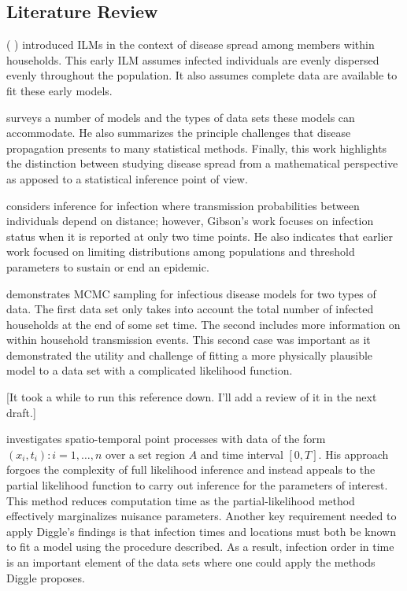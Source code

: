 \documentclass{uwstat572}
\newcommand{\vmcomment}[1]{({\color{blue}{VM's comment:}} \textbf{\color{blue}{#1}})}
\begin{document}
\subsection{Literature Review}
\vmcomment{Again, I don't like this one paper per paragraph. You need better organization of your lit review}
\cite{Haber} introduced ILMs in the context of disease spread among members within households. This early ILM assumes infected individuals are evenly dispersed evenly throughout the population. It also assumes complete data are available to fit these early models. 

\cite{Becker} surveys a number of models and the types of data sets these models can accommodate. 
He also summarizes the principle challenges that disease propagation presents to many statistical methods.
Finally, this work highlights the distinction between studying disease spread from a mathematical perspective as apposed to a statistical inference point of view.  

\cite{Gibson} considers inference for infection where transmission probabilities between individuals depend on distance; however, Gibson's work focuses on infection status when it is reported at only two time points. 
He also indicates that earlier work focused on limiting distributions among populations and threshold parameters to sustain or end an epidemic. 

\cite{ONeill} demonstrates MCMC sampling for infectious disease models for two types of data. 
The first data set only takes into account the total number of infected households at the end of some set time.
The second includes more information on within household transmission events.
This second case was important as it demonstrated the utility and challenge of fitting a more physically plausible model to a data set with a complicated likelihood function.

\cite{McKinley} [It took a while to run this reference down. I'll add a review of it in the next draft.]

\cite{Diggle} investigates spatio-temporal point processes with data of the form $(x_i, t_i): i=1, \dots, n$ over a set region $A$ and time interval $[0, T]$. 
His approach forgoes the complexity of full likelihood inference and instead appeals to the partial likelihood function to carry out inference for the parameters of interest. 
This method reduces computation time as the partial-likelihood method effectively marginalizes nuisance parameters. 
Another key requirement needed to apply Diggle's findings is that infection times and locations must both be known to fit a model using the procedure described.
As a result, infection order in time is an important element of the data sets where one could apply the methods Diggle proposes. 
\end{document}
